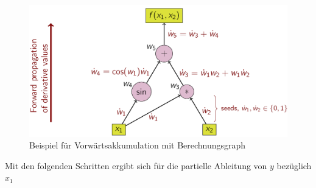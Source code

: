 \documentclass[
]{book}
\theoremstyle{definition}
\theoremstyle{definition}
\theoremstyle{definition}
\theoremstyle{definition}
\theoremstyle{remark}
\begin{document}
\begin{figure}
\centering
\includegraphics{bilder/ForwardAccumulationAutomaticDifferentiation.png}
\caption{Beispiel für Vorwärtsakkumulation mit Berechnungsgraph}
\end{figure}

Mit den folgenden Schritten ergibt sich für die partielle
Ableitung von \(y\) bezüglich \(x_1\)
\end{document}
